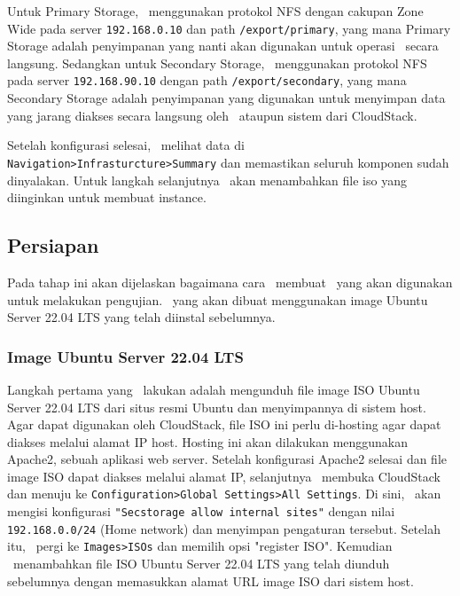Untuk Primary Storage, \saya\ menggunakan protokol NFS dengan cakupan Zone Wide pada server \texttt{192.168.0.10} dan path \texttt{/export/primary}, yang mana Primary Storage adalah penyimpanan yang nanti akan digunakan untuk operasi \vm\ secara langsung. Sedangkan untuk Secondary Storage, \saya\ menggunakan protokol NFS pada server \texttt{192.168.90.10} dengan path \texttt{/export/secondary}, yang mana Secondary Storage adalah penyimpanan yang digunakan untuk menyimpan data yang jarang diakses secara langsung oleh \vm\ ataupun sistem dari CloudStack.

Setelah konfigurasi selesai, \saya\ melihat data di \texttt{Navigation>Infrasturcture>Summary} dan memastikan seluruh komponen sudah dinyalakan. Untuk langkah selanjutnya \saya\ akan menambahkan file iso yang diinginkan untuk membuat instance.

\subsection{Persiapan \vm}
Pada tahap ini akan dijelaskan bagaimana cara \saya\ membuat \vm\ yang akan digunakan untuk melakukan pengujian. \vm\ yang akan dibuat menggunakan image Ubuntu Server 22.04 LTS yang telah diinstal sebelumnya.

\subsubsection{Image Ubuntu Server 22.04 LTS}
Langkah pertama yang \saya\ lakukan adalah mengunduh file image ISO Ubuntu Server 22.04 LTS dari situs resmi Ubuntu dan menyimpannya di sistem host. Agar dapat digunakan oleh CloudStack, file ISO ini perlu di-hosting agar dapat diakses melalui alamat IP host. Hosting ini akan dilakukan menggunakan Apache2, sebuah aplikasi web server. Setelah konfigurasi Apache2 selesai dan file image ISO dapat diakses melalui alamat IP, selanjutnya \saya\ membuka CloudStack dan menuju ke \texttt{Configuration>Global Settings>All Settings}. Di sini, \saya\ akan mengisi konfigurasi \texttt{"Secstorage allow internal sites"} dengan nilai \texttt{192.168.0.0/24} (Home network) dan menyimpan pengaturan tersebut. Setelah itu, \saya\ pergi ke \texttt{Images>ISOs} dan memilih opsi "register ISO". Kemudian \saya\ menambahkan file ISO Ubuntu Server 22.04 LTS yang telah diunduh sebelumnya dengan memasukkan alamat URL image ISO dari sistem host.

